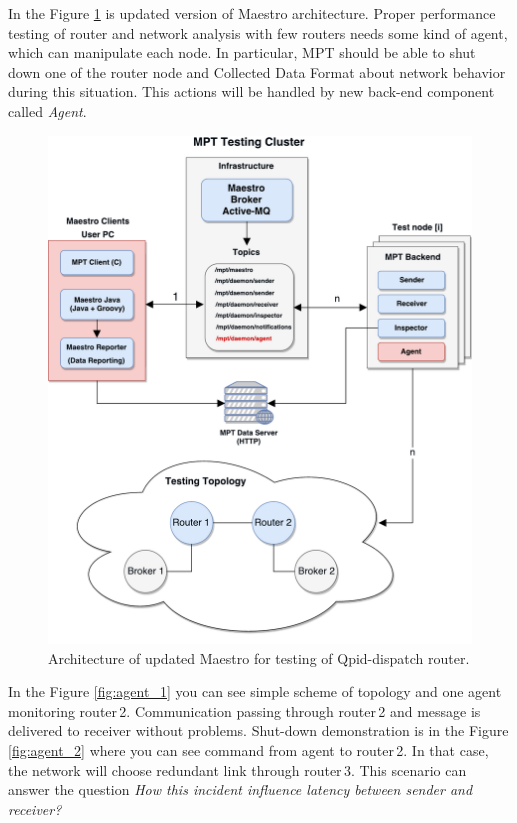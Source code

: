 In the Figure \ref{fig:msg_perf_tool_update} is updated version of Maestro architecture. Proper performance testing of router and network analysis with few routers needs some kind of agent, which can manipulate each node. In particular, MPT should be able to shut down one of the router node and Collected Data Format about network behavior during this situation. This actions will be handled by new back-end component called \emph{Agent}.

\begin{figure}[H]
  \centering
  \includegraphics[width=15cm]{obrazky-figures/msg_perf_tool_for_router.pdf}
  \caption{Architecture of updated Maestro for testing of Qpid-dispatch router.}
  \label{fig:msg_perf_tool_update}
\end{figure}

In the Figure \ref{fig:agent_1} you can see simple scheme of topology and one agent monitoring router\,2. Communication passing through router\,2 and message is delivered to receiver without problems. Shut-down demonstration is in the Figure \ref{fig:agent_2} where you can see command from agent to router\,2. In that case, the network will choose redundant link through router\,3. This scenario can answer the question \emph{How this incident influence latency between sender and receiver?}

